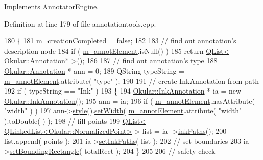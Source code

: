 Implements \hyperlink{classAnnotatorEngine_a50455740303878b891195132df27a2ab}{Annotator\+Engine}.



Definition at line 179 of file annotationtools.\+cpp.


\begin{DoxyCode}
180 \{
181     \hyperlink{classAnnotatorEngine_a0df119b4d87a1e3ea8ed60a96d7ff444}{m\_creationCompleted} = \textcolor{keyword}{false};
182 
183     \textcolor{comment}{// find out annotation's description node}
184     \textcolor{keywordflow}{if} ( \hyperlink{classAnnotatorEngine_ac95af6291cc2f0c601e1bbf8a5e6a0bd}{m\_annotElement}.isNull() )
185                 \textcolor{keywordflow}{return} \hyperlink{classQList}{QList< Okular::Annotation* >}();
186 
187     \textcolor{comment}{// find out annotation's type}
188     \hyperlink{classOkular_1_1Annotation}{Okular::Annotation} * ann = 0;
189     QString typeString = \hyperlink{classAnnotatorEngine_ac95af6291cc2f0c601e1bbf8a5e6a0bd}{m\_annotElement}.attribute( \textcolor{stringliteral}{"type"} );
190 
191     \textcolor{comment}{// create InkAnnotation from path}
192     \textcolor{keywordflow}{if} ( typeString == \textcolor{stringliteral}{"Ink"} )
193     \{
194         \hyperlink{classOkular_1_1InkAnnotation}{Okular::InkAnnotation} * ia = \textcolor{keyword}{new} 
      \hyperlink{classOkular_1_1InkAnnotation}{Okular::InkAnnotation}();
195         ann = ia;
196         \textcolor{keywordflow}{if} ( \hyperlink{classAnnotatorEngine_ac95af6291cc2f0c601e1bbf8a5e6a0bd}{m\_annotElement}.hasAttribute( \textcolor{stringliteral}{"width"} ) )
197             ann->\hyperlink{classOkular_1_1Annotation_ae1f845ddbd6d524b2b388c6c9ef26423}{style}().\hyperlink{classOkular_1_1Annotation_1_1Style_af0643b15b59d282c196f0c6114493d9e}{setWidth}( \hyperlink{classAnnotatorEngine_ac95af6291cc2f0c601e1bbf8a5e6a0bd}{m\_annotElement}.attribute( \textcolor{stringliteral}{"width"} ).toDouble(
      ) );
198         \textcolor{comment}{// fill points}
199         \hyperlink{classQList}{QList< QLinkedList<Okular::NormalizedPoint>} > list = ia
      ->\hyperlink{classOkular_1_1InkAnnotation_a70af1124d2ed92e1e64779423278d707}{inkPaths}();
200         list.append( points );
201         ia->\hyperlink{classOkular_1_1InkAnnotation_a8d347e99fa554b3024035c51421aeeea}{setInkPaths}( list );
202         \textcolor{comment}{// set boundaries}
203         ia->\hyperlink{classOkular_1_1Annotation_a6977075c78f130b71ddbbda924480f38}{setBoundingRectangle}( totalRect );
204     \}
205 
206     \textcolor{comment}{// safety check}

\end{DoxyCode}
